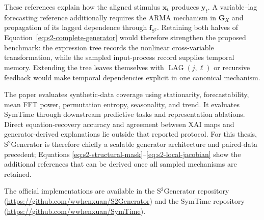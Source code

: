 These references explain how the aligned stimulus $\mathbf x_t$ produces
$\mathbf y_t$. A variable--lag forecasting reference additionally requires
the ARMA mechanism in $\mathbf G_X$ and propagation of its lagged dependence
through $\mathbf f_{\mathrm{S^2}}$. Retaining both halves of
Equation~\eqref{eq:s2-complete-generator} would therefore strengthen the
proposed benchmark: the expression tree records the nonlinear cross-variable
transformation, while the sampled input-process record supplies temporal
memory. Extending the tree leaves themselves with
$\operatorname{LAG}(j,\ell)$ or recursive feedback would make temporal
dependencies explicit in one canonical mechanism.

The paper evaluates synthetic-data coverage using stationarity,
forecastability, mean FFT power, permutation entropy, seasonality, and trend.
It evaluates SymTime through downstream predictive tasks and representation
ablations. Direct equation-recovery accuracy and agreement
between XAI maps and generator-derived explanations lie outside that reported
protocol. For this thesis, S$^2$Generator is therefore chiefly a scalable
generator architecture and paired-data precedent; Equations
\eqref{eq:s2-structural-mask}--\eqref{eq:s2-local-jacobian} show the additional
references that can be derived once all sampled mechanisms are retained.

The official implementations are available in the S$^2$Generator repository
(\url{https://github.com/wwhenxuan/S2Generator}) and the SymTime repository
(\url{https://github.com/wwhenxuan/SymTime}).

